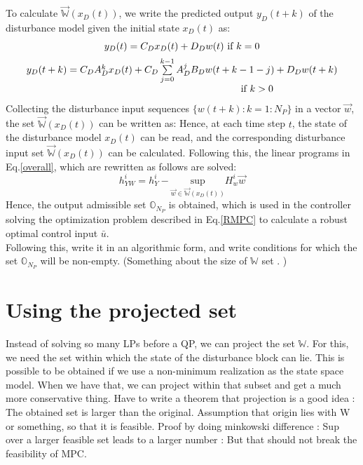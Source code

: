 \documentclass[letterpaper, 10 pt, conference]{ieeeconf}  %
\begin{document}
	To calculate $\vec{\mathbb{W}}(x_D(t))$, we write the predicted output $y_D(t+k)$ of the disturbance model given the initial state $x_D(t)$ as:
	\begin{equation}
	\small
	\begin{matrix}
	y_D(t)=C_Dx_D(t)+D_Dw(t) \text{ if } k=0 \vspace{5pt} \\
	y_D(t+k)=C_DA_D^{k}x_D(t)+ C_D\sum\limits_{j=0}^{k-1}A_D^jB_Dw(t+k-1-j)+D_Dw(t+k) \\ \hspace{150pt}\text{ if } k>0
	\end{matrix}
	\end{equation}
    Collecting the disturbance input sequences  $\{w(t+k):k=1:N_P\}$ in a vector $\vec{w}$, the set $\vec{\mathbb{W}}(x_D(t))$ can be written as:     
    Hence, at each time step $t$, the state of the disturbance model $x_D(t)$ can be read, and the corresponding disturbance input set $\vec{\mathbb{W}}(x_D(t))$ can be calculated. Following this, the linear programs in  Eq.\eqref{overall}, which are rewritten as follows are solved:
    \begin{equation}
    h_{YW}^i = h_Y^i-\underset{\vec{w}\in \vec{\mathbb{W}}(x_D(t))}{\text{sup}} H_w^i \vec{w}  
    \end{equation}     
    Hence, the output admissible set $\mathbb{O}_{N_P}$ is obtained, which is used in the controller solving the optimization problem described in Eq.\eqref{RMPC} to calculate a robust optimal control input $\bar{u}$.
    \\
    {\color{blue} Following this, write it in an algorithmic form, and write conditions for which the set $\mathbb{O}_{N_P}$ will be non-empty. (Something about the size of $\mathbb{W}$ set . )
}
\section{Using the projected set}
Instead of solving so many LPs before a QP, we can project the set $\mathbb{W}$. For this, we need the set within which the state of the disturbance block can lie. This is possible to be obtained if we use a non-minimum realization as the state space model. When we have that, we can project within that subset and get a much more conservative thing. 
Have to write a theorem that projection is a good idea : The obtained set is larger than the original. Assumption that origin lies with W or something, so that it is feasible. Proof by doing minkowski difference : Sup over a larger feasible set leads to a larger number : But that should not break the feasibility of MPC.
    
\end{document}
